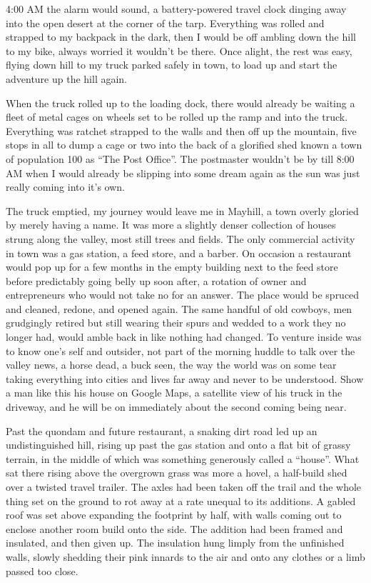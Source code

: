 \documentclass[ebook, 10pt, openright, onecolumn]{memoir}
\begin{document}
4:00 AM the alarm would sound, a battery-powered travel clock dinging away into
the open desert at the corner of the tarp.  Everything was rolled and strapped
to my backpack in the dark, then I would be off ambling down the hill to my
bike, always worried it wouldn't be there.  Once alight, the rest was easy,
flying down hill to my truck parked safely in town, to load up and start the
adventure up the hill again.

When the truck rolled up to the loading dock, there would already be waiting a
fleet of metal cages on wheels set to be rolled up the ramp and into the truck.
Everything was ratchet strapped to the walls and then off up the mountain, five
stops in all to dump a cage or two into the back of a glorified shed known a
town of population 100 as ``The Post Office''.  The postmaster wouldn't be by
till 8:00 AM when I would already be slipping into some dream again as the sun
was just really coming into it's own.

The truck emptied, my journey would leave me in Mayhill, a town overly gloried
by merely having a name.  It was more a slightly denser collection of houses
strung along the valley, most still trees and fields.  The only commercial
activity in town was a gas station, a feed store, and a barber.  On occasion a
restaurant would pop up for a few months in the empty building next to the feed
store before predictably going belly up soon after, a rotation of owner and
entrepreneurs who would not take no for an answer.  The place would be spruced
and cleaned, redone, and opened again.  The same handful of old cowboys, men
grudgingly retired but still wearing their spurs and wedded to a work they no
longer had, would amble back in like nothing had changed.  To venture inside was
to know one's self and outsider, not part of the morning huddle to talk over the
valley news, a horse dead, a buck seen, the way the world was on some tear
taking everything into cities and lives far away and never to be understood.
Show a man like this his house on Google Maps, a satellite view of his truck in
the driveway, and he will be on immediately about the second coming being near.

Past the quondam and future restaurant, a snaking dirt road led up an
undistinguished hill, rising up past the gas station and onto a flat bit of
grassy terrain, in the middle of which was something generously called a
``house''. What sat there rising above the overgrown grass was more a hovel, a
half-build shed over a twisted travel trailer.  The axles had been taken off the
trail and the whole thing set on the ground to rot away at a rate unequal to its
additions.  A gabled roof was set above expanding the footprint by half, with
walls coming out to enclose another room build onto the side.  The addition had
been framed and insulated, and then given up.  The insulation hung limply from
the unfinished walls, slowly shedding their pink innards to the air and onto any
clothes or a limb passed too close.
\end{document}
